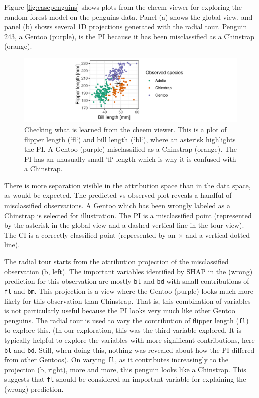 \documentclass[
]{sn-jnl}
\begin{document}
Figure \ref{fig:casepenguins} shows plots from the cheem viewer for
exploring the random forest model on the penguins data. Panel (a) shows
the global view, and panel (b) shows several 1D projections generated
with the radial tour. Penguin 243, a Gentoo (purple), is the PI because
it has been misclassified as a Chinstrap (orange).

\begin{CodeChunk}
\begin{figure}

{\centering \includegraphics[width=1\linewidth]{./figures/case_penguins_BlFl} 

}

\caption[Checking what is learned from the cheem viewer]{Checking what is learned from the cheem viewer. This is a plot of flipper length (`fl`) and bill length (`bl`), where an asterisk highlights the PI. A Gentoo (purple) misclassified as a Chinstrap (orange). The PI has an unusually small `fl` length which is why it is confused with a Chinstrap.}\label{fig:casepenguinsblfl}
\end{figure}
\end{CodeChunk}

There is more separation visible in the attribution space than in the
data space, as would be expected. The predicted vs observed plot reveals
a handful of misclassified observations. A Gentoo which has been wrongly
labeled as a Chinstrap is selected for illustration. The PI is a
misclassified point (represented by the asterisk in the global view and
a dashed vertical line in the tour view). The CI is a correctly
classified point (represented by an \(\times\) and a vertical dotted
line).

The radial tour starts from the attribution projection of the
misclassified observation (b, left). The important variables identified
by SHAP in the (wrong) prediction for this observation are mostly
\texttt{bl} and \texttt{bd} with small contributions of \texttt{fl} and
\texttt{bm}. This projection is a view where the Gentoo (purple) looks
much more likely for this observation than Chinstrap. That is, this
combination of variables is not particularly useful because the PI looks
very much like other Gentoo penguins. The radial tour is used to vary
the contribution of flipper length (\texttt{fl}) to explore this. (In
our exploration, this was the third variable explored. It is typically
helpful to explore the variables with more significant contributions,
here \texttt{bl} and \texttt{bd}. Still, when doing this, nothing was
revealed about how the PI differed from other Gentoos). On varying
\texttt{fl}, as it contributes increasingly to the projection (b,
right), more and more, this penguin looks like a Chinstrap. This
suggests that \texttt{fl} should be considered an important variable for
explaining the (wrong) prediction.
\end{document}
